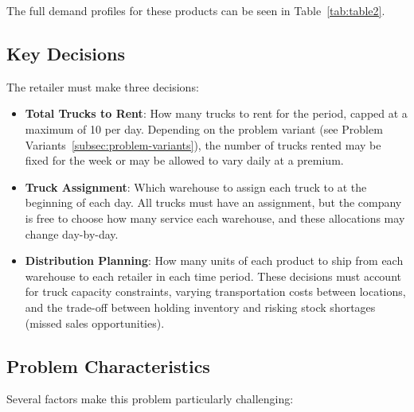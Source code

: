 \documentclass[a4paper,12pt]{article}
\begin{document}
The full demand profiles for these products can be seen in Table~\ref{tab:table2}.

\subsection{Key Decisions}\label{subsec:key-decisions}

The retailer must make three decisions:
\begin{itemize}
    \item \textbf{Total Trucks to Rent}: How many trucks to rent for the period, capped at a maximum of 10 per day.
Depending on the problem variant (see Problem Variants~\ref{subsec:problem-variants}), the number of trucks rented may be fixed for the week or may be allowed to vary daily at a premium.
    \item \textbf{Truck Assignment}: Which warehouse to assign each truck to at the beginning of each day.
All trucks must have an assignment, but the company is free to choose how many service each warehouse, and these allocations may change day-by-day.
    \item \textbf{Distribution Planning}: How many units of each product to ship from each warehouse to each retailer in each time period.
These decisions must account for truck capacity constraints, varying transportation costs between locations, and the trade-off between holding inventory and risking stock shortages (missed sales opportunities).
\end{itemize}

\subsection{Problem Characteristics}\label{subsec:problem-characteristics}

Several factors make this problem particularly challenging:
\end{document}
